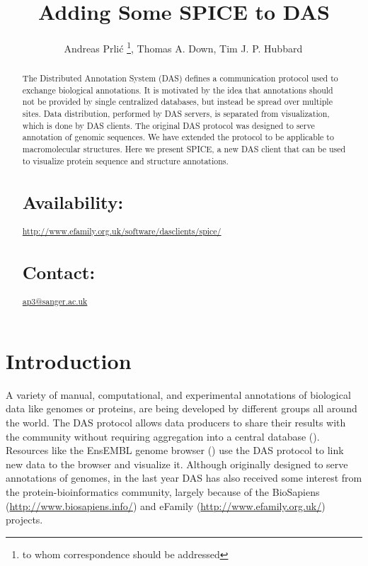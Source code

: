 \documentclass{bioinfo}
\begin{document}

\title[short Title]{Adding Some SPICE to DAS}
\author[Prli\'c \textit{et~al}]{Andreas Prli\'c \footnote{to whom correspondence should be addressed}, Thomas A. Down, Tim J. P. Hubbard\,}
\address{Wellcome Trust Sanger Institute
Wellcome Trust Genome Campus,
Hinxton, Cambridge, CB10 1SA, UK}
\maketitle

\begin{abstract}

The Distributed Annotation System (DAS) defines a communication protocol used 
to exchange biological annotations. It is motivated by the idea that annotations 
should not be provided by single centralized databases, but instead be spread 
over multiple sites. Data distribution, performed by DAS servers, is separated
from visualization, which is done by DAS clients. The original DAS protocol was 
designed to serve annotation of genomic sequences. We have extended the protocol 
to be applicable to macromolecular structures. Here we present SPICE, a new DAS
client that can be used to visualize protein sequence and structure annotations.

\section{Availability:}  \href{http://www.efamily.org.uk/software/dasclients/spice/}{http://www.efamily.org.uk/software/dasclients/spice/}

\section{Contact:} \href{ap3@sanger.ac.uk}{ap3@sanger.ac.uk}
\end{abstract}

\section{Introduction}

A variety of manual, computational, and experimental annotations of  biological data like genomes or proteins, are being developed by different groups all around the world. 
The DAS protocol allows data producers to share their results with the community without requiring 
aggregation into a central database (\cite{Dowell.Jokerst.ea:2001}). Resources 
like the EnsEMBL genome browser (\cite{ENSEMBL:2005}) use the DAS protocol to link new data to the 
browser and visualize it. Although originally designed to serve annotations of 
genomes, in the last year DAS has also received some interest from the protein-bioinformatics
community, largely because of the BioSapiens (\href{http://www.biosapiens.info/}{http://www.biosapiens.info/})
and eFamily (\href{http://www.efamily.org.uk/}{http://www.efamily.org.uk/}) projects.
\end{document}
